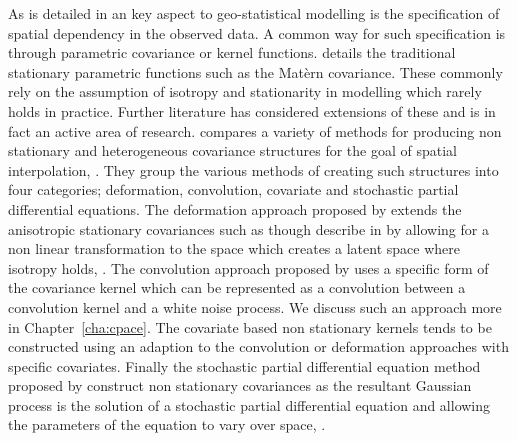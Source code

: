As is detailed in \cite{cressie_statistics_2010} an key aspect to geo-statistical modelling is the specification of spatial dependency in the observed data.
A common way for such specification is through parametric covariance or kernel functions.
\cite{cressie_statistics_2010} details the traditional stationary parametric functions such as the Mat\`{e}rn covariance.
These commonly rely on the assumption of isotropy and stationarity in modelling which rarely holds in practice.
Further literature has considered extensions of these and is in fact an active area of research.
\citeauthor{schmidt_flexible_2020} compares a variety of methods for producing non stationary and heterogeneous covariance structures for the goal of spatial interpolation, \citep{schmidt_flexible_2020}.
They group the various methods of creating such structures into four categories; deformation, convolution, covariate and stochastic partial differential equations.
The deformation approach proposed by \citeauthor{sampson_nonparametric_1992} extends the anisotropic stationary covariances such as though describe in \cite{cressie_statistics_2010} by allowing for a non linear transformation to the space which creates a latent space where isotropy holds, \cite{sampson_nonparametric_1992}.
The convolution approach proposed by \citeauthor{higdon_space_2002} uses a specific form of the covariance kernel which can be represented as a convolution between a convolution kernel and a white noise process.
We discuss such an approach more in Chapter~\ref{cha:cpace}.
The covariate based non stationary kernels tends to be constructed using an adaption to the convolution or deformation approaches with specific covariates.
Finally the stochastic partial differential equation method proposed by \citeauthor{lindgren_explicit_2011} construct non stationary covariances as the resultant Gaussian process is the solution of a stochastic partial differential equation and allowing the parameters of the equation to vary over space, \citep{lindgren_explicit_2011}. 

